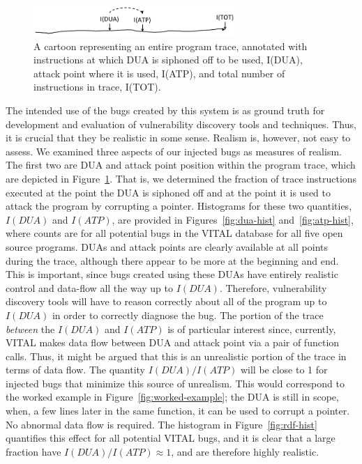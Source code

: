 \begin{figure}
\centering
\includegraphics[width=3in]{trace-dua-atp.png}
\caption{A cartoon representing an entire program trace, annotated with instructions at which DUA is siphoned off to be used, I(DUA), attack point where it is used, I(ATP), and total number of instructions in trace, I(TOT).}
\label{fig:dua-atp-trace}
\end{figure}

The intended use of the bugs created by this system is as ground truth for development and evaluation of vulnerability discovery tools and techniques. 
Thus, it is crucial that they be realistic in some sense.  
Realism is, however, not easy to assess.
We examined three aspects of our injected bugs as measures of realism. 
The first two are DUA and attack point position within the program trace, which are depicted in Figure~\ref{fig:dua-atp-trace}.
That is, we determined the fraction of trace instructions executed at the point the DUA is siphoned off and at the point it is used to attack the program by corrupting a pointer.
Histograms for these two quantities, $I(DUA)$ and $I(ATP)$, are provided in Figures~\ref{fig:dua-hist} and~\ref{fig:atp-hist}, where counts are for all potential bugs in the VITAL database for all five open source programs. 
DUAs and attack points are clearly available at all points during the trace, although there appear to be more at the beginning and end.
This is important, since bugs created using these DUAs have entirely realistic control and data-flow all the way up to $I(DUA)$.
Therefore, vulnerability discovery tools will have to reason correctly about all of the program up to $I(DUA)$ in order to correctly diagnose the bug.
The portion of the trace \emph{between} the $I(DUA)$ and $I(ATP)$ is of particular interest since, currently, VITAL makes data flow between DUA and attack point via a pair of function calls.
Thus, it might be argued that this is an unrealistic portion of the trace in terms of data flow.
The quantity $I(DUA)/I(ATP)$ will be close to 1 for injected bugs that minimize this source of unrealism.
This would correspond to the worked example in Figure~\ref{fig:worked-example}; the DUA is still in scope, when, a few lines later in the same function, it can be used to corrupt a pointer.
No abnormal data flow is required.
The histogram in Figure~\ref{fig:rdf-hist} quantifies this effect for all potential VITAL bugs, and it is clear that a large fraction have $I(DUA)/I(ATP) \approx 1$, and are therefore highly realistic.

